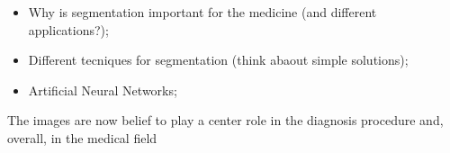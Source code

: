 \documentclass[../main.tex]{subfiles}
\begin{document}
\begin{itemize}

    \item Why is segmentation important for the medicine (and different applications?);
    \item Different tecniques for segmentation (think abaout simple solutions);
    \item Artificial Neural Networks;
   
\end{itemize}
The images are now belief to play a center role in the diagnosis procedure and, overall, in the medical field
\end{document}
